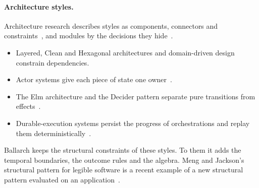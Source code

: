 \documentclass[11pt]{article}
\theoremstyle{definition}
\theoremstyle{plain}
\begin{document}
\paragraph{Architecture styles.} Architecture research describes styles as components, connectors and constraints~\citep{PerryWolf1992,ShawGarlan1996}, and modules by the decisions they hide~\citep{Parnas1972}.
\begin{itemize}[nosep]
  \item Layered, Clean and Hexagonal architectures and domain-driven design~\citep{Martin2017Clean,Cockburn2005,Evans2003} constrain dependencies.
  \item Actor systems give each piece of state one owner~\citep{HewittBishopSteiger1973,Armstrong2003,Bykov2011Orleans}.
  \item The Elm architecture and the Decider pattern separate pure transitions from effects~\citep{ElmGuide,Chassaing2021Decider}.
  \item Durable-execution systems persist the progress of orchestrations and replay them deterministically~\citep{Burckhardt2021Durable}.
\end{itemize}
Ballarch keeps the structural constraints of these styles. To them it adds the temporal boundaries, the outcome rules and the algebra. Meng and Jackson's structural pattern for legible software is a recent example of a new structural pattern evaluated on an application~\citep{MengJackson2025}.
\end{document}

